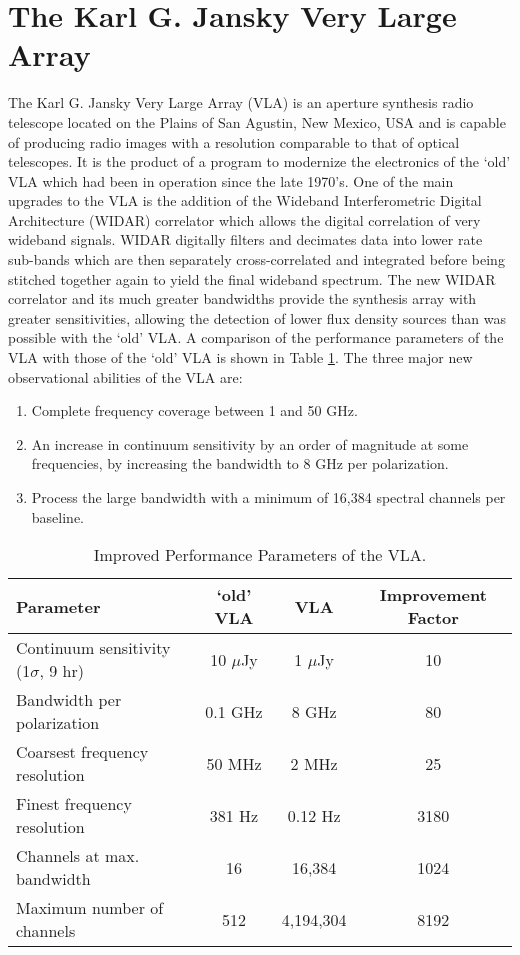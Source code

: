 \section{The Karl G. Jansky Very Large Array}\label{sec:3.5}
The Karl G. Jansky Very Large Array (VLA) is an aperture synthesis radio telescope located on the Plains of San Agustin, New Mexico, USA and is capable of producing radio images with a resolution comparable to that of optical telescopes. It is the product of a program to modernize the electronics of the `old' VLA which had been in operation since the late 1970's. One of the main upgrades to the VLA is the addition of the Wideband Interferometric Digital Architecture (WIDAR) correlator which allows the digital correlation of very wideband signals. WIDAR digitally filters and decimates data into lower rate sub-bands which are then separately cross-correlated and integrated before being stitched together again to yield the final wideband spectrum. The new WIDAR correlator and its much greater bandwidths provide the synthesis array with greater sensitivities, allowing the detection of lower flux density sources than was possible with the `old' VLA. A comparison of the performance parameters of the VLA with those of the `old' VLA is shown in Table \ref{tab:3.1}. The three major new observational abilities of the VLA are:
\begin{enumerate}
\item Complete frequency coverage between 1 and 50 GHz.
\item An increase in continuum sensitivity by an order of magnitude at some frequencies, by increasing the bandwidth to 8 GHz per polarization.
\item Process the large bandwidth with a minimum of 16,384 spectral channels per baseline.
\end{enumerate}

\begin{table}
\begin{center}
\caption[Improved Performance Parameters of the VLA.]
{Improved Performance Parameters of the VLA.}
\begin{tabular}{lccc}
\hline
\hline
\rule{0pt}{2.5ex}Parameter & `old' VLA & VLA & Improvement Factor \\
\hline
\rule{0pt}{2.5ex}Continuum sensitivity (1$\sigma$, 9 hr) & 10 $\mu$Jy & 1 $\mu$Jy& 10\\
Bandwidth per polarization & 0.1 GHz & 8 GHz & 80\\ 
Coarsest frequency resolution & 50 MHz & 2 MHz & 25\\ 
Finest frequency resolution & 381 Hz & 0.12 Hz & 3180\\ 
Channels at max. bandwidth & 16 & 16,384 & 1024\\ 
Maximum number of channels & 512 & 4,194,304 & 8192\\ 
\hline
\end{tabular}
\label{tab:3.1}
\end{center}
\end{table}

